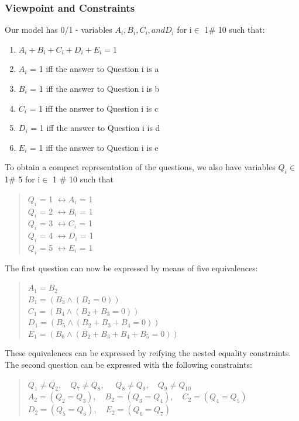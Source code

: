 \documentclass[a4paper]{scrartcl}
\begin{document}
\subsubsection{Viewpoint and Constraints}
Our model has 0/1 - variables $A_i, B_i, C_i, and D_i$ for i$\in$ 1$\#$ 10 
such that:
\begin{enumerate}
\item
$A_i + B_i + C_i + D_i + E_i = 1$
\item
$A_i$ = 1 iff the answer to Question i is a
\item
$B_i$ = 1 iff the answer to Question i is b
\item
$C_i$ = 1 iff the answer to Question i is c
\item
$D_i$ = 1 iff the answer to Question i is d
\item
$E_i$ = 1 iff the answer to Question i is e
\end{enumerate}
To obtain a compact representation of the questions, 
we also have variables $Q_i \in $ 1$\#$ 5 for i$\in$ 1 $\#$ 10 such that\\
\begin{quote}
$Q_i$ = 1 $\leftrightarrow A_i$ = 1\\
$Q_i$ = 2 $\leftrightarrow B_i$ = 1\\
$Q_i$ = 3 $\leftrightarrow C_i$ = 1\\
$Q_i$ = 4 $\leftrightarrow D_i$ = 1\\
$Q_i$ = 5 $\leftrightarrow E_i$ = 1
\end{quote}
The first question can now be expressed by means of five equivalences:\\
\begin{quote}
$ A_1 = B_2$ \\
$B_1 = (B_3\land (B_2=0))$ \\ 
$C_1 = (B_4\land (B_2+B_3=0))$\\ 
$D_1 = (B_5\land (B_2+B_3+B_4=0))$\\ 
$E_1 = (B_6\land (B_2+B_3+B_4+B_5=0))$
\end{quote}
These equivalences can be expressed by reifying the 
nested equality constraints.\\

The second question can be expressed with the following constraints:\\
\begin{quote}
$Q_1\neq Q_2,\quad Q_7\neq Q_8,$
$\quad Q_8\neq Q_9,\quad Q_9\neq Q_10$ \\ 
$A_2=(Q_2=Q_3),\quad B_2=(Q_3=Q_4),\quad C_2=(Q_4=Q_5)$ \\ 
$D_2=(Q_5=Q_6),\quad E_2=(Q_6=Q_7) $
\end{quote}
\end{document}
